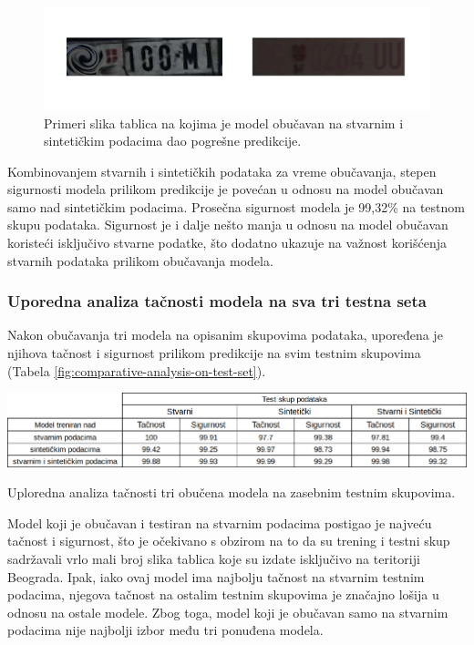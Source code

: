\documentclass[a4paper,12pt]{article}
\begin{document}
	\begin{figure}[H]
		\centering
		\includegraphics[width=\textwidth]{assets/bad-predictions-real-and-synthetic-data-model.png}
		\caption{Primeri slika tablica na kojima je model obučavan na stvarnim i sintetičkim podacima dao pogrešne predikcije.}
		\label{fig:bad-predictions-real-and-synthetic-data-model}
	\end{figure}
	
	Kombinovanjem stvarnih i sintetičkih podataka za vreme obučavanja, stepen sigurnosti modela prilikom predikcije je povećan u odnosu na model obučavan samo nad sintetičkim podacima. Prosečna sigurnost modela je 99,32\% na testnom skupu podataka. Sigurnost je i dalje nešto manja u odnosu na model obučavan koristeći isključivo stvarne podatke, što dodatno ukazuje na važnost korišćenja stvarnih podataka prilikom obučavanja modela.
	
	\subsubsection{Uporedna analiza tačnosti modela na sva tri testna seta}

	Nakon obučavanja tri modela na opisanim skupovima podataka, upoređena je njihova tačnost i sigurnost prilikom predikcije na svim testnim skupovima (Tabela \ref{fig:comparative-analysis-on-test-set}).
	
	\begin{table}[H]
		\centering
		\includegraphics[width=\textwidth]{assets/comparative-analysis-on-test-set.png}
		\caption{Uploredna analiza tačnosti tri obučena modela na zasebnim testnim skupovima.}
		\label{fig:comparative-analysis-on-test-set}
	\end{table}
	
	Model koji je obučavan i testiran na stvarnim podacima postigao je najveću tačnost i sigurnost, što je očekivano s obzirom na to da su trening i testni skup sadržavali vrlo mali broj slika tablica koje su izdate isključivo na teritoriji Beograda. Ipak, iako ovaj model ima najbolju tačnost na stvarnim testnim podacima, njegova tačnost na ostalim testnim skupovima je značajno lošija u odnosu na ostale modele. Zbog toga, model koji je obučavan samo na stvarnim podacima nije najbolji izbor među tri ponuđena modela.
	
\end{document}
